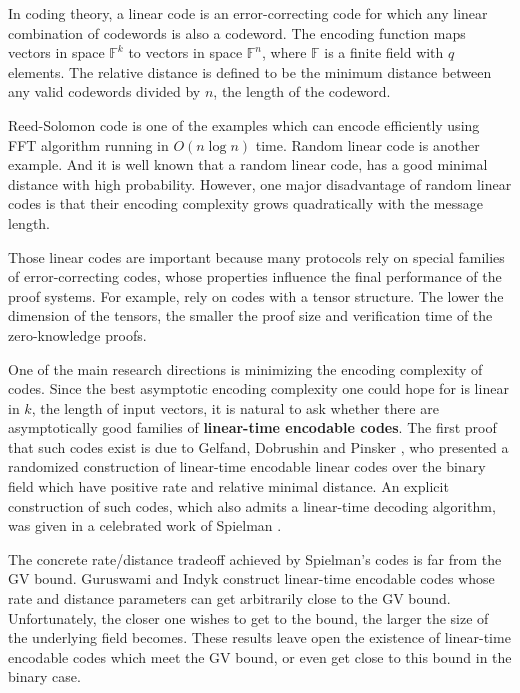 In coding theory, a linear code is an error-correcting code for which any linear combination of codewords is also a codeword. The encoding function maps vectors in space $\mathbb{F}^k$ to vectors in space $\mathbb{F}^n$, where $\mathbb{F}$ is a finite field with $q$ elements. The relative distance is defined to be the minimum distance between any valid codewords divided by $n$, the length of the codeword. 

Reed-Solomon code is one of the examples which can encode efficiently using FFT algorithm running in $O(n \log n)$ time.
Random linear code is another example.
And it is well known that a random linear code, 
has a good minimal distance with high probability.
However, one major disadvantage of random linear codes is that their encoding
complexity grows quadratically with the message length.

Those linear codes are important because many protocols rely on special families of error-correcting codes, whose properties influence the final performance of the proof systems. For example, \cite{brakedown} \cite{cryptoeprint:2020/1426} \cite{BCL22} rely on codes with a tensor structure. The lower the dimension of the tensors, the smaller the proof size and verification time of the zero-knowledge proofs.

One of the main research directions is minimizing the encoding complexity
of codes. Since the best asymptotic encoding complexity one could hope for is linear in $k$, the length of input vectors, it is natural to ask whether there are asymptotically good families of \textbf{linear-time encodable codes}.
The first proof that such codes exist is due to Gelfand, Dobrushin and Pinsker \cite{gelfand1973complexity}, who presented a randomized construction of linear-time encodable linear codes over the binary field which
have positive rate and relative minimal distance.
An explicit construction of such codes, which also admits a linear-time decoding algorithm, was given in a celebrated work of Spielman \cite{DBLP:conf/stoc/Spielman95}.

The concrete rate/distance tradeoff achieved by Spielman’s codes is far
from the GV bound. Guruswami and Indyk \cite{DBLP:journals/tit/GuruswamiI05} construct linear-time encodable codes whose rate and distance parameters can get arbitrarily close to the GV bound. 
Unfortunately, the closer one wishes to get to the bound, 
the larger the size of the underlying field becomes. 
These results leave open the existence of linear-time encodable codes which meet the GV bound, or even get close to this bound in the binary case.


